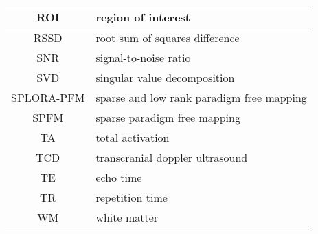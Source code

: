 \begin{table}[h]
\begin{tabular}{|c|p{}|}
    \hline
    ROI & region of interest \\
    \hline
    RSSD & root sum of squares difference \\
    \hline
    SNR & signal-to-noise ratio \\
    \hline
    SVD & singular value decomposition \\
    \hline
    SPLORA-PFM & sparse and low rank paradigm free mapping \\
    \hline
    SPFM & sparse paradigm free mapping \\
    \hline
    TA & total activation \\
    \hline
    TCD & transcranial doppler ultrasound \\
    \hline
    TE & echo time \\
    \hline
    TR & repetition time \\
    \hline
    WM & white matter \\
    \hline
    \end{tabular}
\end{table}
